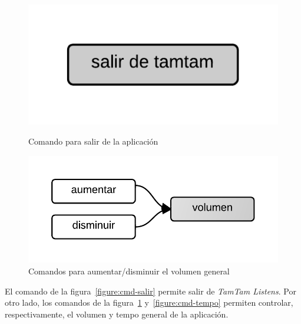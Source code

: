 \begin{figure}[H]
\begin{minipage}[b]{0.5\linewidth}
\centering
\includegraphics[width=0.6\linewidth]{./graphics/salir.png}
\caption{Comando para salir de la aplicaci\'on}
\label{figure:cmd-salir}
\end{minipage}
\quad
\begin{minipage}[b]{0.5\linewidth}
\centering
\includegraphics[width=0.6\linewidth]{./graphics/cmd-vol.png}
\caption{Comandos para aumentar/disminuir el volumen general}
\label{figure:cmd-vol}
\end{minipage}
\end{figure}

El comando de la figura~\ref{figure:cmd-salir} permite salir de \emph{TamTam Listens}. Por otro lado, los comandos de la figura~\ref{figure:cmd-vol}
y~\ref{figure:cmd-tempo} permiten controlar, respectivamente, el volumen y tempo general de la aplicaci\'on.

